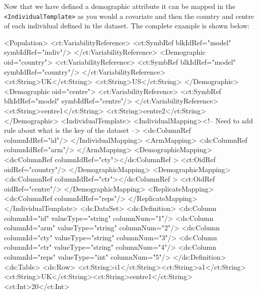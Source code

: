 \documentclass[a4paper,10pt]{article}
\newcommand{\xelem}[1]{\texttt{<#1>}\index{XML Element!\texttt{<#1>}}}
\begin{document}
Now that we have defined a demographic attribute it can be mapped in
the \xelem{IndividualTemplate} as you would a covariate and then the
country and centre of each individual defined in the dataset. The
complete example is shown below:
%
\begin{xmlcode}
        <Population>
            <ct:VariabilityReference>
                <ct:SymbRef blkIdRef="model" symbIdRef="indiv"/>
            </ct:VariabilityReference>
            <Demographic oid="country">
                <ct:VariabilityReference>
                    <ct:SymbRef blkIdRef="model" symbIdRef="country"/>
                </ct:VariabilityReference>
                <ct:String>UK</ct:String>
                <ct:String>US</ct:String>
            </Demographic>
            <Demographic oid="centre">
                <ct:VariabilityReference>
                    <ct:SymbRef blkIdRef="model" symbIdRef="centre"/>
                </ct:VariabilityReference>
                <ct:String>centre1</ct:String>
                <ct:String>centre2</ct:String>
            </Demographic>
            <IndividualTemplate>
                <IndividualMapping><!-- Need to add rule about what is the key of the dataset -->
                    <ds:ColumnRef  columnIdRef="id"/>
                </IndividualMapping>
                <ArmMapping>
                    <ds:ColumnRef  columnIdRef="arm"/>
                </ArmMapping>
                <DemographicMapping>
                    <ds:ColumnRef  columnIdRef="cty"></ds:ColumnRef >
                    <ct:OidRef oidRef="country"/>
                </DemographicMapping>
                <DemographicMapping>
                    <ds:ColumnRef  columnIdRef="ctr"></ds:ColumnRef >
                    <ct:OidRef oidRef="centre"/>
                </DemographicMapping>
                <ReplicateMapping>
                    <ds:ColumnRef  columnIdRef="reps"/>
                </ReplicateMapping>
            </IndividualTemplate>
            <ds:DataSet>
            <ds:Definition>
                <ds:Column columnId="id" valueType="string" columnNum="1"/>
                <ds:Column columnId="arm" valueType="string" columnNum="2"/>
                <ds:Column columnId="cty" valueType="string" columnNum="3"/>
                <ds:Column columnId="ctr" valueType="string" columnNum="4"/>
                <ds:Column columnId="reps" valueType="int" columnNum="5"/>
            </ds:Definition>
                <ds:Table>
                    <ds:Row>
                        <ct:String>i1</ct:String><ct:String>a1</ct:String><ct:String>UK</ct:String><ct:String>centre1</ct:String><ct:Int>20</ct:Int>

\end{xmlcode}
\end{document}

